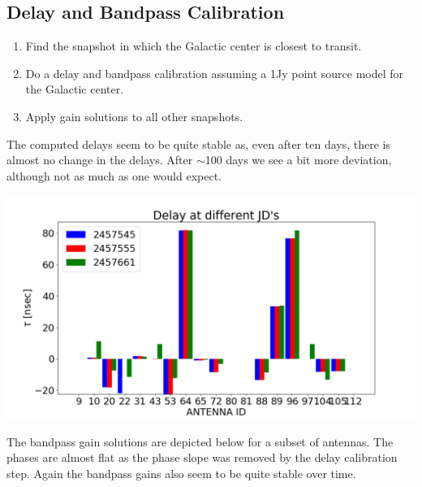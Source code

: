 \documentclass[a0,portrait]{a0poster}
\begin{document}
\begin{multicols}{2}
\subsection*{Delay and Bandpass Calibration}
\begin{enumerate}
 \item Find the snapshot in which the Galactic center is closest to transit.
 \item Do a delay and bandpass calibration assuming a 1Jy point source model for the Galactic center.
 \item Apply gain solutions to all other snapshots.
\end{enumerate}
The computed delays seem to be quite stable as, even after ten days, there is almost no change in the delays. After $\sim$100 
days we see a bit more deviation, although not as much as one would expect.

\begin{center}\vspace{1cm}
\includegraphics[width=0.8\linewidth]{delay.png}
\end{center}\vspace{1cm}
The bandpass gain solutions are depicted below for a subset of antennas.
The phases are almost flat as the phase slope was removed by the delay calibration step. Again the bandpass 
gains also seem to be quite stable over time.


\end{multicols}
\end{document}
